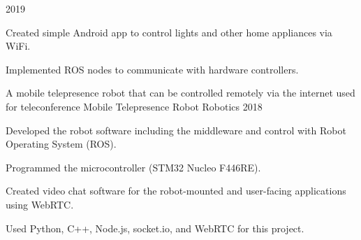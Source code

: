 \begin{cventries}
        {2019} %
        {
            \begin{cvitems} %
                \item {Created simple Android app to control lights and other home appliances via WiFi.}
                \item {Implemented ROS nodes to communicate with hardware controllers.\\}
            \end{cvitems}
        }
    \cventry
        {A mobile telepresence robot that can be controlled remotely via the internet used for teleconference} %
        {Mobile Telepresence Robot} %
        {Robotics} %
        {2018} %
        {
            \begin{cvitems} %
                \item {Developed the robot software including the middleware and control with Robot Operating System (ROS).}
                \item {Programmed the microcontroller (STM32 Nucleo F446RE).}
                \item {Created video chat software for the robot-mounted and user-facing applications using WebRTC.}
                \item {Used Python, C++, Node.js, socket.io, and WebRTC for this project.}
            \end{cvitems}
        }
\end{cventries}
